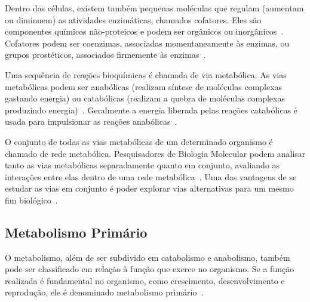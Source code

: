 \indent Dentro das células, existem também pequenas moléculas que regulam (aumentam ou diminuem) as atividades enzimáticas, chamados cofatores. Eles são componentes químicos não-proteicos e podem ser orgânicos ou inorgânicos~\cite{lacroixCTS08}. Cofatores podem ser coenzimas, associadas momentaneamente às enzimas, ou grupos prostéticos, associados firmemente às enzimas~\cite{Cap2schomburg}.

\indent Uma sequência de reações bioquímicas é chamada de via metabólica. As vias metabólicas podem ser anabólicas (realizam síntese de moléculas complexas gastando energia) ou catabólicas (realizam a quebra de moléculas complexas produzindo energia)~\cite{lacroixCTS08}. Geralmente a energia liberada pelas reações catabólicas é usada para impulsionar as reações anabólicas~\cite{carterClass}. 



\indent O conjunto de todas as vias metabólicas de um determinado organismo é chamado de rede metabólica. Pesquisadores de Biologia Molecular podem analisar tanto as vias metabólicas separadamente quanto em conjunto, avaliando as interações entre elas dentro de uma rede metabólica~\cite{lacroixCTS08}. Uma das vantagens de se estudar as vias em conjunto é poder explorar vias alternativas para um mesmo fim biológico~\cite{lacroixCTS08}.

\subsection{Metabolismo Primário}

\indent O metabolismo, além de ser subdivido em catabolismo e anabolismo, também pode ser classificado em relação à função que exerce no organismo. Se a função realizada é fundamental no organismo, como crescimento, desenvolvimento e reprodução, ele é denominado metabolismo primário~\cite{Cap3schomburg}. 


